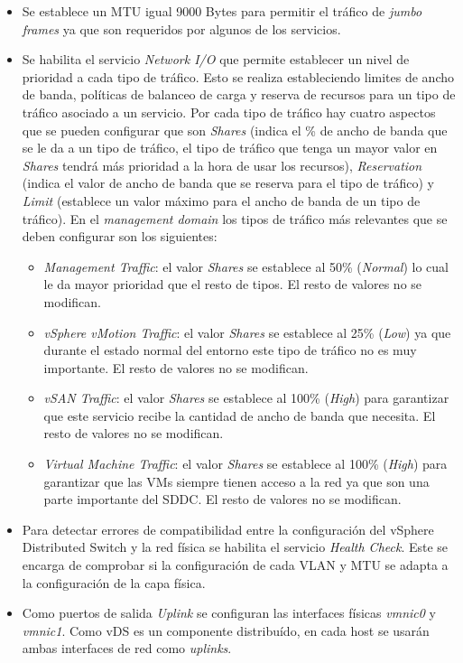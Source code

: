 \begin{itemize}
    
    \item Se establece un MTU igual 9000 Bytes para permitir el tráfico de \textit{jumbo frames} ya que son requeridos por algunos de los servicios.
    
    \item Se habilita el servicio \textit{Network I/O} que permite establecer un nivel de prioridad a cada tipo de tráfico. Esto se realiza estableciendo limites de ancho de banda, políticas de balanceo de carga y reserva de recursos para un tipo de tráfico asociado a un servicio. Por cada tipo de tráfico hay cuatro aspectos que se pueden configurar que son \textit{Shares} (indica el \% de ancho de banda que se le da a un tipo de tráfico, el tipo de tráfico que tenga un mayor valor en \textit{Shares} tendrá más prioridad a la hora de usar los recursos), \textit{Reservation} (indica el valor de ancho de banda que se reserva para el tipo de tráfico) y \textit{Limit} (establece un valor máximo para el ancho de banda de un tipo de tráfico). En el \textit{management domain} los tipos de tráfico más relevantes que se deben configurar son los siguientes:
    \begin{itemize}
      \item \textit{Management Traffic}: el valor \textit{Shares} se establece al 50\% (\textit{Normal}) lo cual le da mayor prioridad que el resto de tipos. El resto de valores no se modifican.
      \item \textit{vSphere vMotion Traffic}: el valor \textit{Shares} se establece al 25\% (\textit{Low}) ya que durante el estado normal del entorno este tipo de tráfico no es muy importante. El resto de valores no se modifican.
      \item \textit{vSAN Traffic}: el valor \textit{Shares} se establece al 100\% (\textit{High}) para garantizar que este servicio recibe la cantidad de ancho de banda que necesita. El resto de valores no se modifican.
      \item \textit{Virtual Machine Traffic}: el valor \textit{Shares} se establece al 100\% (\textit{High}) para garantizar que las VMs siempre tienen acceso a la red ya que son una parte importante del SDDC. El resto de valores no se modifican.
    \end{itemize}
    
    \item Para detectar errores de compatibilidad entre la configuración del vSphere Distributed Switch y la red física se habilita el servicio \textit{Health Check}. Este se encarga de comprobar si la configuración de cada VLAN y MTU se adapta a la configuración de la capa física.
    
    \item Como puertos de salida \textit{Uplink} se configuran las interfaces físicas \textit{vmnic0} y \textit{vmnic1}. Como vDS es un componente distribuído, en cada host se usarán ambas interfaces de red como \textit{uplinks}.
    
\end{itemize}
